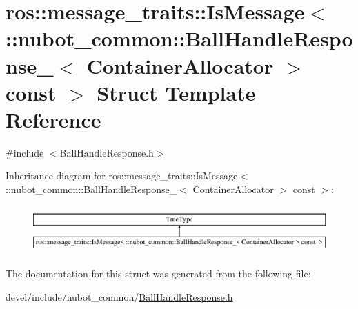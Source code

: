 \hypertarget{structros_1_1message__traits_1_1IsMessage_3_01_1_1nubot__common_1_1BallHandleResponse___3_01Contd950527337dd3175b6eebfd5d394e05e}{\section{ros\-:\-:message\-\_\-traits\-:\-:Is\-Message$<$ \-:\-:nubot\-\_\-common\-:\-:Ball\-Handle\-Response\-\_\-$<$ Container\-Allocator $>$ const $>$ Struct Template Reference}
\label{structros_1_1message__traits_1_1IsMessage_3_01_1_1nubot__common_1_1BallHandleResponse___3_01Contd950527337dd3175b6eebfd5d394e05e}
}


{\ttfamily \#include $<$Ball\-Handle\-Response.\-h$>$}

Inheritance diagram for ros\-:\-:message\-\_\-traits\-:\-:Is\-Message$<$ \-:\-:nubot\-\_\-common\-:\-:Ball\-Handle\-Response\-\_\-$<$ Container\-Allocator $>$ const $>$\-:\begin{figure}[H]
\begin{center}
\leavevmode
\includegraphics[height=1.848185cm]{structros_1_1message__traits_1_1IsMessage_3_01_1_1nubot__common_1_1BallHandleResponse___3_01Contd950527337dd3175b6eebfd5d394e05e}
\end{center}
\end{figure}


The documentation for this struct was generated from the following file\-:\begin{DoxyCompactItemize}
\item 
devel/include/nubot\-\_\-common/\hyperlink{BallHandleResponse_8h}{Ball\-Handle\-Response.\-h}\end{DoxyCompactItemize}
